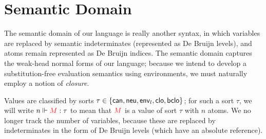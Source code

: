 \documentclass{article}
\DeclarePairedDelimiter\Angles{\langle}{\rangle}
\DeclarePairedDelimiter\Squares{[}{]}
\DeclarePairedDelimiter\Braces{\lbrace}{\rbrace}
\newcommand\FmtKwd[1]{\mathsf{#1}}
\newcommand\FmtThin[1]{{\color{ProcessBlue}#1}}
\newcommand\FmtTm[1]{{\color{Violet}#1}}
\newcommand\FmtVal[1]{{\color{Red}{#1}}}
\begin{document}
\section{Semantic Domain}

The semantic domain of our language is really another syntax, in which
variables are replaced by semantic indeterminates (represented as De
Bruijn levels), and atoms remain represented as De Bruijn indices. The
semantic domain captures the weak-head normal forms of our language;
because we intend to develop a substitution-free evaluation semantics using
environments, we must naturally employ a notion of \emph{closure}.

\newcommand\SortCan{\FmtKwd{can}}
\newcommand\SortNeu{\FmtKwd{neu}}
\newcommand\SortClo{\FmtKwd{clo}}
\newcommand\SortBClo{\FmtKwd{bclo}}
\newcommand\SortEnv[1]{\FmtKwd{env}_{#1}}
\newcommand\IsVal[3]{{#1}\Vdash\FmtVal{#2}:{#3}}
\newcommand\Val[2]{{#1}\Vdash{#2}}

\newcommand\Clo[4]{
  \Squares*{
    \FmtThin{#1}%
    \mathbin{\color{gray}*}%
    \Angles*{
      \FmtTm{#4}
      \mathbin{\color{gray}\triangleleft}%
      \FmtThin{#2}
      \mathbin{\color{gray}*}%
      \FmtVal{#3}
    }
  }
}

\newcommand\BClo[4]{
  \Squares*{
    \FmtThin{#1}%
    \mathbin{\color{gray}*}%
    \Angles*{
      \FmtTm{#4}
      \mathbin{\color{gray}\triangleleft^+}%
      \FmtThin{#2}
      \mathbin{\color{gray}*}%
      \FmtVal{#3}
    }
  }
}


Values are classified by sorts
$\tau\in\Braces*{\SortCan,\SortNeu,\SortEnv{l},\SortClo,\SortBClo}$; for
such a sort $\tau$, we will write $\IsVal{n}{M}{\tau}$ to mean that
$\FmtVal{M}$ is a value of sort $\tau$ with $n$ atoms. We no longer
track the number of variables, because these are replaced by
indeterminates in the form of De Bruijn levels (which have an absolute
reference).
\end{document}
